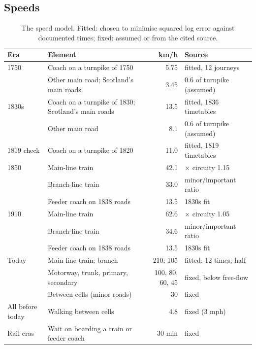 \documentclass[11pt,a4paper]{article}
\begin{document}
\subsection{Speeds}
\begin{table}[tbp]\centering\small\caption{The speed model. Fitted: chosen to minimise squared log error against documented times; fixed: assumed or from the cited source.}\label{tab:speeds}\begin{tabular}{p{2.1cm}p{6.6cm}rp{3.8cm}}\toprule Era & Element & km/h & Source\\\midrule
1750 & Coach on a turnpike of 1750 & 5.75 & fitted, 12 journeys\\
 & Other main road; Scotland's main roads & 3.45 & 0.6 of turnpike (assumed)\\
1830s & Coach on a turnpike of 1830; Scotland's main roads & 13.5 & fitted, 1836 timetables\\
 & Other main road & 8.1 & 0.6 of turnpike (assumed)\\
1819 check & Coach on a turnpike of 1820 & 11.0 & fitted, 1819 timetables\\
1850 & Main-line train & 42.1 & \citet{leunig2006} $\times$ circuity 1.15\\
 & Branch-line train & 33.0 & minor/important ratio\\
 & Feeder coach on 1838 roads & 13.5 & 1830s fit\\
1910 & Main-line train & 62.6 & \citet{leunig2006} $\times$ circuity 1.05\\
 & Branch-line train & 34.6 & minor/important ratio\\
 & Feeder coach on 1838 roads & 13.5 & 1830s fit\\
Today & Main-line train; branch & 210; 105 & fitted, 12 times; half\\
 & Motorway, trunk, primary, secondary & 100, 80, 60, 45 & fixed, below \citet{dft2025} free-flow\\
 & Between cells (minor roads) & 30 & fixed\\
All before today & Walking between cells & 4.8 & fixed (3 mph)\\
Rail eras & Wait on boarding a train or feeder coach & 30 min & fixed\\
\bottomrule\end{tabular}\end{table}
\end{document}
